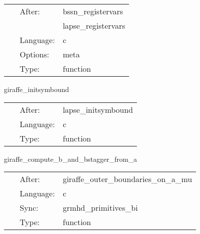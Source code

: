 \hspace{5mm}

 \begin{tabular*}{160mm}{cll} 
~ & After:  & bssn\_registervars \\ 
~& ~ &lapse\_registervars\\ 
~ & Language:  & c \\ 
~ & Options:  & meta \\ 
~ & Type:  & function \\ 
\end{tabular*} 


\vspace{5mm}


\hspace{5mm} giraffe\_initsymbound 

\hspace{5mm}{\it schedule symmetries } 


\hspace{5mm}

 \begin{tabular*}{160mm}{cll} 
~ & After:  & lapse\_initsymbound \\ 
~ & Language:  & c \\ 
~ & Type:  & function \\ 
\end{tabular*} 


\vspace{5mm}


\hspace{5mm} giraffe\_compute\_b\_and\_bstagger\_from\_a 

\hspace{5mm}{\it compute b and b\_stagger from a } 


\hspace{5mm}

 \begin{tabular*}{160mm}{cll} 
~ & After:  & giraffe\_outer\_boundaries\_on\_a\_mu \\ 
~ & Language:  & c \\ 
~ & Sync:  & grmhd\_primitives\_bi \\ 
~ & Type:  & function \\ 
\end{tabular*} 


\vspace{5mm}


